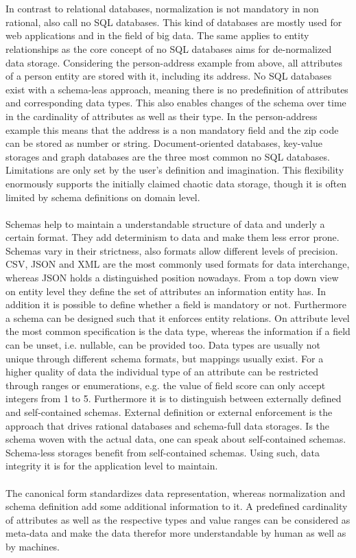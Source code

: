 \\\\
In contrast to relational databases, normalization is not mandatory in non rational, also call no SQL databases. This kind of databases are mostly used for web applications and in the field of big data. The same applies to entity relationships as the core concept of no SQL databases aims for de-normalized data storage. Considering the person-address example from above, all attributes of a person entity are stored with it, including its address. No SQL databases exist with a schema-leas approach, meaning there is no predefinition of attributes and corresponding data types. This also enables changes of the schema over time in the cardinality of attributes as well as their type. In the person-address example this means that the address is a non mandatory field and the zip code can be stored as number or string. Document-oriented databases, key-value storages and graph databases are the three most common no SQL databases.  Limitations are only set by the user's definition and imagination. This flexibility enormously supports the initially claimed chaotic data storage, though it is often limited by schema definitions on domain level. 
\\\\
Schemas help to maintain a understandable structure of data and underly a certain format. They add determinism to data and make them less error prone. Schemas vary in their strictness, also formats allow different levels of precision. CSV, JSON and XML are the most commonly used formats for data interchange, whereas JSON holds a distinguished position nowadays. From a top down view on entity level they define the set of attributes an information entity has. In addition it is possible to define whether a field is mandatory or not. Furthermore a schema can be designed such that it enforces entity relations. On attribute level the most common specification is the data type, whereas the information if a field can be unset, i.e. nullable, can be provided too. Data types are usually not unique through different schema formats, but mappings usually exist. For a higher quality of data the individual type of an attribute can be restricted through ranges or enumerations, e.g. the value of field score can only accept integers from 1 to 5. Furthermore it is to distinguish between externally defined and self-contained schemas. External definition or external enforcement is the approach that drives rational databases and schema-full data storages. Is the schema woven with the actual data, one can speak about self-contained schemas. Schema-less storages benefit from self-contained schemas. Using such, data integrity it is for the application level to maintain.
\\\\
The canonical form standardizes data representation, whereas normalization and schema definition add some additional information to it. A predefined cardinality of attributes as well as the respective types and value ranges can be considered as meta-data and make the data therefor more understandable by human as well as by machines. 

